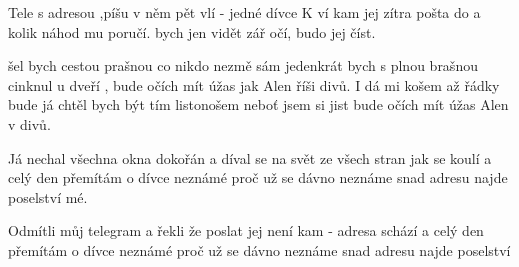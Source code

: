 
  \zs

Tele s adresou ,píšu v něm pět vlí - jedné dívce 
K ví kam jej zítra pošta do a kolik náhod mu poručí. 
 bych jen vidět zář očí,  budo jej číst. 

\ks
\zr

 šel bych cestou prašnou co nikdo nezmě sám jedenkrát bych s plnou brašnou cinknul 
u dveří , bude  očích mít úžas jak Alen  říši divů. 
I  dá mi košem až řádky bude  já chtěl bych být tím listonošem neboť jsem si jist 
bude  očích mít úžas  Alen v  divů. 

\kr
\zs

Já nechal všechna okna dokořán a díval se na svět ze všech stran jak se koulí 
a celý den přemítám o dívce neznámé proč už se dávno neznáme snad adresu najde poselství mé. 

\ks
\zr  \kr
\zs

Odmítli můj telegram a řekli že poslat jej není kam - adresa schází 
a celý den přemítám o dívce neznámé proč už se dávno neznáme snad 
adresu najde poselství 

\ks

\zr  \kr

\kp
